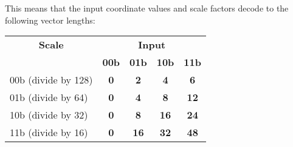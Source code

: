 \begin{minipage}{\textwidth}
This means that the input coordinate values and scale factors decode to the
following vector lengths:

\begin{tabular}{|l|c|c|c|c|}
	\hline
	\multicolumn{1}{|c|}{\bf Scale}	&	\multicolumn{4}{c|}{\bf Input}						\\ \cline{2-5}
							&	{\bf 00b}	&	{\bf 01b}	&	{\bf 10b}	&	{\bf 11b}	\\ \hline
	00b (divide by 128)		&	{\bf 0}		&	{\bf 2}		&	{\bf 4}		&	{\bf 6}		\\ \hline
	01b (divide by 64)		&	{\bf 0}		&	{\bf 4}		&	{\bf 8}		&	{\bf 12}	\\ \hline
	10b (divide by 32)		&	{\bf 0}		&	{\bf 8}		&	{\bf 16}	&	{\bf 24}	\\ \hline
	11b (divide by 16)		&	{\bf 0}		&	{\bf 16}	&	{\bf 32}	&	{\bf 48}	\\ \hline
\end{tabular}


\vspace{1 cm}
\end{minipage}

\setlength{\parindent}{\savedparindent}

